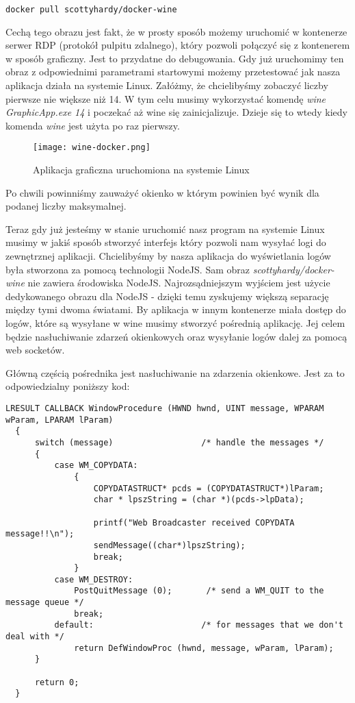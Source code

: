 \begin{lstlisting}[caption={Pobierania obrazu który ma zainstalowane środowisko wine}]
  docker pull scottyhardy/docker-wine
\end{lstlisting}
Cechą tego obrazu jest fakt, że w prosty sposób możemy uruchomić w kontenerze serwer RDP (protokół pulpitu zdalnego), który pozwoli połączyć się z kontenerem w sposób graficzny. Jest to przydatne do debugowania. Gdy już uruchomimy ten obraz z odpowiednimi parametrami startowymi możemy przetestować jak nasza aplikacja działa na systemie Linux. Załóżmy, że chcielibyśmy zobaczyć liczby pierwsze nie większe niż 14. W tym celu musimy wykorzystać komendę \textit{wine GraphicApp.exe 14} i poczekać aż wine się zainicjalizuje. Dzieje się to wtedy kiedy komenda \textit{wine} jest użyta po raz pierwszy.
\begin{figure}[htbp]
  \centering
  \texttt{[image: wine-docker.png]}
  \caption{Aplikacja graficzna uruchomiona na systemie Linux}
  \label{fig:wine_docker}
\end{figure}
Po chwili powinniśmy zauważyć okienko w którym powinien być wynik dla podanej liczby maksymalnej.
\par
Teraz gdy już jesteśmy w stanie uruchomić nasz program na systemie Linux musimy w jakiś sposób stworzyć interfejs który pozwoli nam wysyłać logi do zewnętrznej aplikacji. Chcielibyśmy by nasza aplikacja do wyświetlania logów była stworzona za pomocą technologii NodeJS. Sam obraz \textit{scottyhardy/docker-wine} nie zawiera środowiska NodeJS. Najrozsądniejszym wyjściem jest użycie dedykowanego obrazu dla NodeJS - dzięki temu zyskujemy większą separację między tymi dwoma światami. By aplikacja w innym kontenerze miała dostęp do logów, które są wysyłane w wine musimy stworzyć pośrednią aplikację. Jej celem będzie nasłuchiwanie zdarzeń okienkowych oraz wysyłanie logów dalej za pomocą web socketów. 
\par
Główną częścią pośrednika jest nasłuchiwanie na zdarzenia okienkowe. Jest za to odpowiedzialny poniższy kod:
\begin{lstlisting}[caption={Fragment aplikacji odpowiedzialnej za dalsze przekazywanie logów}]
  LRESULT CALLBACK WindowProcedure (HWND hwnd, UINT message, WPARAM wParam, LPARAM lParam)
  {
      switch (message)                  /* handle the messages */
      {
          case WM_COPYDATA:
              {
                  COPYDATASTRUCT* pcds = (COPYDATASTRUCT*)lParam;
                  char * lpszString = (char *)(pcds->lpData);

                  printf("Web Broadcaster received COPYDATA message!!\n");
                  sendMessage((char*)lpszString);
                  break;
              }
          case WM_DESTROY:
              PostQuitMessage (0);       /* send a WM_QUIT to the message queue */
              break;
          default:                      /* for messages that we don't deal with */
              return DefWindowProc (hwnd, message, wParam, lParam);
      }

      return 0;
  }
\end{lstlisting}
